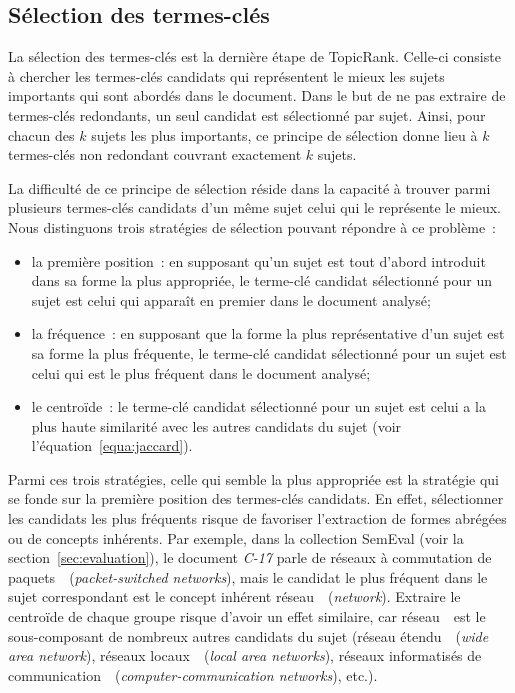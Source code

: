  \subsection{Sélection des termes-clés}
  \label{subsec:selection_des_termes_cles}
    La sélection des termes-clés est la dernière étape de TopicRank. Celle-ci
    consiste à chercher les termes-clés candidats qui représentent le mieux les
    sujets importants qui sont abordés dans le document. Dans le but de ne pas
    extraire de termes-clés redondants, un seul candidat est sélectionné par
    sujet.
    Ainsi, pour chacun des $k$ sujets les plus importants, ce principe de
    sélection donne lieu à $k$ termes-clés non redondant couvrant exactement $k$
    sujets.

    La difficulté de ce principe de sélection réside dans la capacité à trouver
    parmi plusieurs termes-clés candidats d'un même sujet celui qui le
    représente le mieux. Nous distinguons trois stratégies de sélection pouvant
    répondre à ce problème~:
    \begin{itemize}
      \item{la première position~: en supposant qu'un sujet est tout d'abord
            introduit dans sa forme la plus appropriée, le terme-clé candidat
            sélectionné pour un sujet est celui qui apparaît en premier dans le
            document analysé;}
      \item{la fréquence~: en supposant que la forme la plus représentative d'un
            sujet est sa forme la plus fréquente, le terme-clé candidat
            sélectionné pour un sujet est celui qui est le plus fréquent dans le
            document analysé;}
      \item{le centroïde~: le terme-clé candidat sélectionné pour un sujet est
            celui a la plus haute similarité avec les autres candidats du sujet
            (voir l'équation~\ref{equa:jaccard}).}
    \end{itemize}
    Parmi ces trois stratégies, celle qui semble la plus appropriée est la
    stratégie qui se fonde sur la première position des termes-clés candidats.
    En effet, sélectionner les candidats les plus fréquents risque de favoriser
    l'extraction de formes abrégées ou de concepts inhérents. Par exemple, dans
    la collection SemEval (voir la section~\ref{sec:evaluation}), le document
    \textit{C-17} parle de \og réseaux à commutation de
    paquets~\fg\ (\textit{packet-switched networks}), mais le candidat le plus
    fréquent dans le sujet correspondant est le concept inhérent
    \og réseau~\fg\ (\textit{network}). Extraire le centroïde de chaque groupe
    risque d'avoir un effet similaire, car \og réseau~\fg\ est le sous-composant
    de nombreux autres candidats du sujet (\og réseau étendu~\fg\ (\textit{wide
    area network}), \og réseaux locaux~\fg\ (\textit{local area networks}),
    \og réseaux informatisés de
    communication~\fg\ (\textit{computer-communication networks}), etc.).

